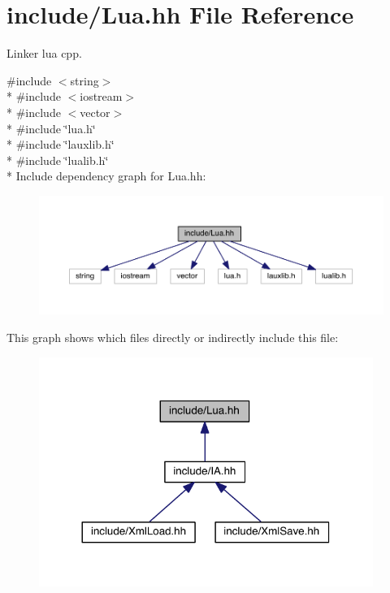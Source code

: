 \hypertarget{_lua_8hh}{}\section{include/\+Lua.hh File Reference}
\label{_lua_8hh}


Linker lua cpp.  


{\ttfamily \#include $<$string$>$}\\*
{\ttfamily \#include $<$iostream$>$}\\*
{\ttfamily \#include $<$vector$>$}\\*
{\ttfamily \#include \char`\"{}lua.\+h\char`\"{}}\\*
{\ttfamily \#include \char`\"{}lauxlib.\+h\char`\"{}}\\*
{\ttfamily \#include \char`\"{}lualib.\+h\char`\"{}}\\*
Include dependency graph for Lua.\+hh\+:\nopagebreak
\begin{figure}[H]
\begin{center}
\leavevmode
\includegraphics[width=350pt]{_lua_8hh__incl}
\end{center}
\end{figure}
This graph shows which files directly or indirectly include this file\+:
\nopagebreak
\begin{figure}[H]
\begin{center}
\leavevmode
\includegraphics[width=308pt]{_lua_8hh__dep__incl}
\end{center}
\end{figure}
